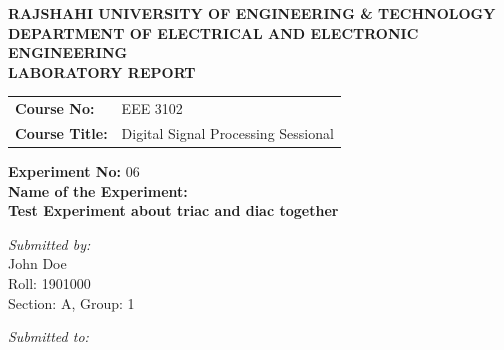 \documentclass[12pt,a4paper]{article}
\begin{document}
\begin{titlepage}
    \sffamily
    \centering
    \vspace*{1cm}
    
    \Large \textbf{\MakeUppercase{ Rajshahi University of Engineering \& Technology }} \\
    \vspace{0.5cm}
    \large \textbf{\MakeUppercase{ Department of Electrical and Electronic Engineering }} \\
    
    \vspace{2.5cm}
    \Large \textbf{LABORATORY REPORT} \\
    \vspace{1cm}
    
    \begin{tabular}{ll}
        \textbf{Course No:} & EEE 3102 \\
        \textbf{Course Title:} & Digital Signal Processing Sessional \\
    \end{tabular}
    
    \vspace{2cm}
    
    \textbf{Experiment No:} 06 \\
    \vspace{0.5cm}
    \textbf{Name of the Experiment:} \\
    \Large \textbf{ Test Experiment about triac and diac together } \\
    
    \vspace{2.5cm}
    
    \begin{minipage}[t]{0.4\textwidth}
        \begin{flushleft} \large
            \emph{Submitted by:}\\
            John Doe \\
            Roll: 1901000 \\
            Section: A, Group: 1
        \end{flushleft}
    \end{minipage}
    \hfill
    \begin{minipage}[t]{0.5\textwidth}
        \begin{flushright} \large
            \emph{Submitted to:} \\
            

\end{flushright}
\end{minipage}
\end{titlepage}
\end{document}
